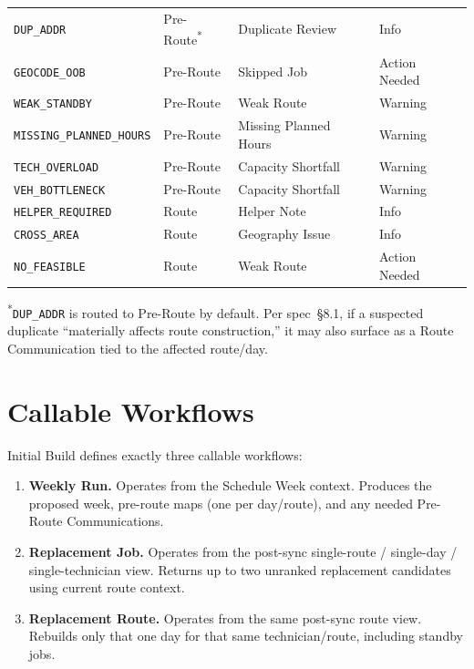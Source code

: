 \documentclass[12pt]{article}
\begin{document}
{\begin{longtable}{lllp{4.5cm}}
\texttt{DUP\_ADDR}           & Pre-Route\textsuperscript{*} & Duplicate Review     & Info \\
\texttt{GEOCODE\_OOB}        & Pre-Route & Skipped Job          & Action Needed \\
\texttt{WEAK\_STANDBY}       & Pre-Route & Weak Route           & Warning \\
\texttt{MISSING\_PLANNED\_HOURS} & Pre-Route & Missing Planned Hours & Warning \\
\texttt{TECH\_OVERLOAD}      & Pre-Route & Capacity Shortfall   & Warning \\
\texttt{VEH\_BOTTLENECK}     & Pre-Route & Capacity Shortfall   & Warning \\
\texttt{HELPER\_REQUIRED}    & Route     & Helper Note          & Info \\
\texttt{CROSS\_AREA}         & Route     & Geography Issue      & Info \\
\texttt{NO\_FEASIBLE}        & Route     & Weak Route           & Action Needed \\
\bottomrule
\end{longtable}
}

\noindent\textsuperscript{*}\texttt{DUP\_ADDR} is routed to Pre-Route by default.
Per spec~\S8.1, if a suspected duplicate ``materially affects route construction,'' it may also surface as a Route Communication tied to the affected route/day.

\section*{Callable Workflows}
\label{sec:workflows}

Initial Build defines exactly three callable workflows:

\begin{enumerate}
    \item \textbf{Weekly Run.} Operates from the Schedule Week context.  Produces the proposed week, pre-route maps (one per day/route), and any needed Pre-Route Communications.
    \item \textbf{Replacement Job.} Operates from the post-sync single-route / single-day / single-technician view.  Returns up to two unranked replacement candidates using current route context.
    \item \textbf{Replacement Route.} Operates from the same post-sync route view.  Rebuilds only that one day for that same technician/route, including standby jobs.
\end{enumerate}
\end{document}
